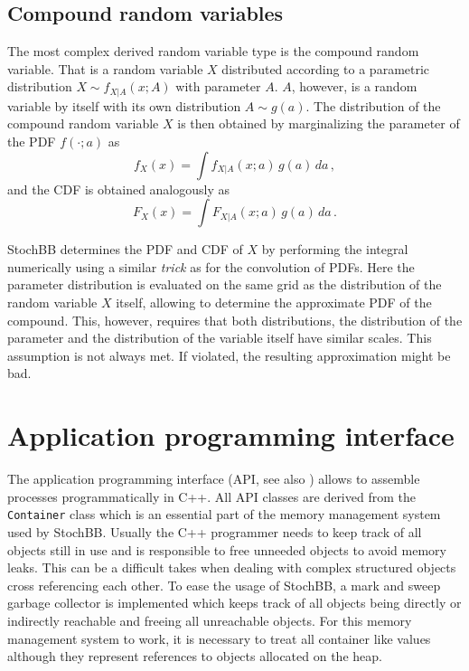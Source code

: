 \documentclass[a4paper, 10pt]{paper}
\newcommand{\code}[1]{\texttt{#1}}
\newcommand{\class}[1]{\code{#1}}
\begin{document}
\subsection{Compound random variables}
The most complex derived random variable type is the compound random variable. That is a random variable
$X$ distributed according to a parametric distribution $X\sim f_{X|A}(x;A)$ with parameter $A$. $A$, however, 
is a random variable by itself with its own distribution $A\sim g(a)$. The distribution of the compound 
random variable $X$ is then obtained by marginalizing the parameter of the PDF $f(\cdot;a)$ as 
\begin{equation}
 f_X(x) = \int f_{X|A}(x;a)\,g(a)\,da\,,\nonumber
\end{equation}
and the CDF is obtained analogously as
\begin{equation}
 F_X(x) = \int F_{X|A}(x;a)\,g(a)\,da\,.\nonumber
\end{equation}

StochBB determines the PDF and CDF of $X$ by performing the integral numerically using a similar \emph{trick}
as for the convolution of PDFs. Here the parameter distribution is evaluated on the same grid as the distribution
of the random variable $X$ itself, allowing to determine the approximate PDF of the compound. This, however, requires 
that both distributions, the distribution of the parameter and the distribution of the variable itself have similar 
scales. This assumption is not always met. If violated, the resulting approximation might be bad.


\section{Application programming interface} \label{sec:api}
The application programming interface (API, see also \cite{stochbbapi}) allows to assemble processes
programmatically in C++.
All API classes are derived from the \class{Container} class which is an essential part of the
memory management system used by StochBB. Usually the C++ programmer needs to keep track of all
objects still in use and is responsible to free unneeded objects to avoid memory leaks. This can
be a difficult takes when dealing with complex structured objects cross referencing each other.
To ease the usage of StochBB, a mark and sweep garbage collector is implemented which keeps track
of all objects being directly or indirectly reachable and freeing all unreachable objects. For
this memory management system to work, it is necessary to treat all container like values
although they represent references to objects allocated on the heap.
\end{document}
